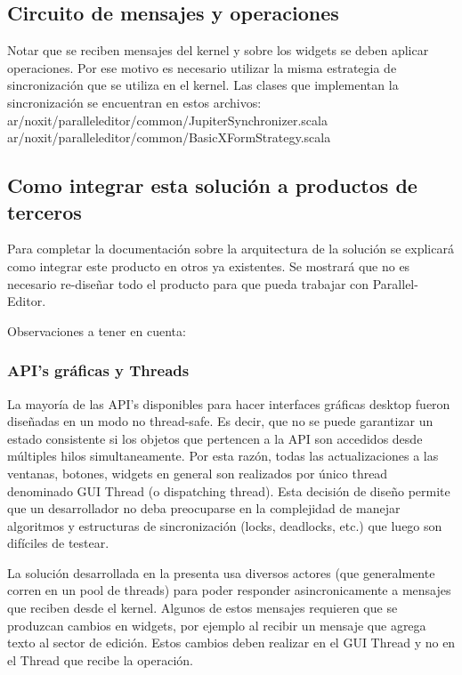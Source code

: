 \documentclass[12pt,a4paper]{article}
\begin{document}
\subsection{Circuito de mensajes y operaciones}

Notar que se reciben mensajes del kernel y sobre los widgets se deben aplicar operaciones. Por ese motivo es necesario 
utilizar la misma estrategia de sincronización que se utiliza en el kernel. Las clases que implementan la sincronización se 
encuentran en estos archivos:
ar/noxit/paralleleditor/common/JupiterSynchronizer.scala
ar/noxit/paralleleditor/common/BasicXFormStrategy.scala

\subsection{Como integrar esta solución a productos de terceros}
Para completar la documentación sobre la arquitectura de la solución se explicará como integrar este producto en otros ya
existentes. Se mostrará que no es necesario re-diseñar todo el producto para que pueda trabajar con Parallel-Editor.

Observaciones a tener en cuenta:

\subsubsection{API’s gráficas y Threads}

La mayoría de las API’s disponibles para hacer interfaces gráficas desktop fueron diseñadas en un 
modo no thread-safe. Es decir, que no se puede garantizar un estado consistente si los objetos que pertencen a la API son
accedidos desde múltiples hilos simultaneamente. Por esta razón, todas las actualizaciones a las ventanas, botones, widgets
en general son realizados por único thread denominado GUI Thread (o dispatching thread). Esta decisión de diseño permite que
un desarrollador no deba preocuparse en la complejidad de manejar algoritmos y estructuras de sincronización
(locks, deadlocks, etc.) que luego son difíciles de testear.

La solución desarrollada en la presenta usa diversos actores (que generalmente corren en un pool de threads) para poder 
responder asincronicamente a mensajes que reciben desde el kernel. Algunos de estos mensajes requieren que se produzcan
cambios en widgets, por ejemplo al recibir un mensaje que agrega texto al sector de edición. Estos cambios deben realizar en
el GUI Thread y no en el Thread que recibe la operación.
\end{document}
